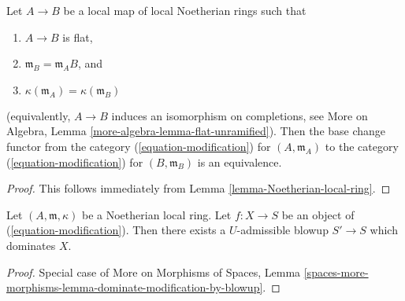 \begin{lemma}
\label{lemma-equivalence-to-completion}
Let $A \to B$ be a local map of local Noetherian rings such that
\begin{enumerate}
\item $A \to B$ is flat,
\item $\mathfrak m_B = \mathfrak m_A B$, and
\item $\kappa(\mathfrak m_A) = \kappa(\mathfrak m_B)$
\end{enumerate}
(equivalently, $A \to B$ induces an isomorphism on completions, see
More on Algebra, Lemma \ref{more-algebra-lemma-flat-unramified}).
Then the base change functor from the category
(\ref{equation-modification}) for $(A, \mathfrak m_A)$ to the category
(\ref{equation-modification}) for $(B, \mathfrak m_B)$
is an equivalence.
\end{lemma}

\begin{proof}
This follows immediately from Lemma \ref{lemma-Noetherian-local-ring}.
\end{proof}

\begin{lemma}
\label{lemma-dominate-by-admissible-blowup}
Let $(A, \mathfrak m, \kappa)$ be a Noetherian local ring.
Let $f : X \to S$ be an object of (\ref{equation-modification}).
Then there exists a $U$-admissible blowup $S' \to S$
which dominates $X$.
\end{lemma}

\begin{proof}
Special case of More on Morphisms of Spaces,
Lemma \ref{spaces-more-morphisms-lemma-dominate-modification-by-blowup}.
\end{proof}











